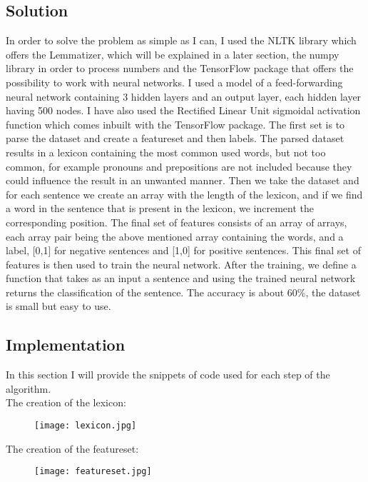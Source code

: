\documentclass[a4paper,10pt]{report}
\begin{document}
\subsection{Solution}
In order to solve the problem as simple as I can, I used the NLTK library which offers the Lemmatizer, which will be explained in a later section, the numpy library 
in order to process numbers and the TensorFlow package that offers the possibility to work with neural networks. I used a model of a feed-forwarding neural network 
containing 3 hidden layers and an output layer, each hidden layer having 500 nodes. I have also used the 
Rectified Linear Unit sigmoidal activation function which comes inbuilt with the TensorFlow package. 
The first set is to parse the dataset and create a featureset and then labels. The parsed dataset results
in a lexicon containing the most common used words, but not too common, for example pronouns and prepositions
are not included because they could influence the result in an unwanted manner. Then we take the dataset and for
each sentence we create an array with the length of the lexicon, and if we find a word in the sentence that is present
in the lexicon, we increment the corresponding position. The final set of features consists of an array of arrays,
each array pair being the above mentioned array containing the words, and a label, [0,1] for negative sentences and
[1,0] for positive sentences. This final set of features is then used to train the neural network. After the training,
we define a function that takes as an input a sentence and using the trained neural network returns the 
classification of the sentence. The accuracy is about 60\%, the dataset is small but easy to use.

\subsection{Implementation}
In this section I will provide the snippets of code used for each step of the algorithm.\\
The creation of the lexicon:\\
\begin{figure}[H]
  \centering
   \texttt{[image: lexicon.jpg]}
 \end{figure}

The creation of the featureset:\\

\begin{figure}[H]
 \centering
  \texttt{[image: featureset.jpg]}
 \end{figure}
\end{document}
